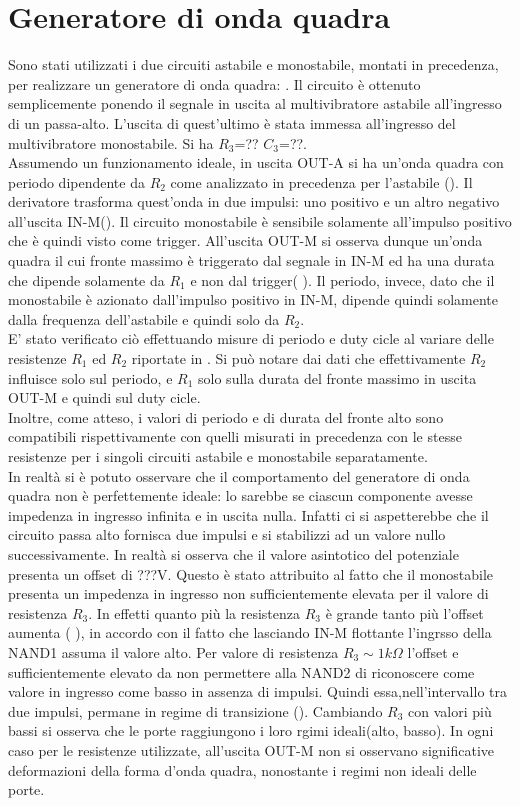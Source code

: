 \section{Generatore di onda quadra}
Sono stati utilizzati i due circuiti astabile e monostabile, montati in precedenza, per realizzare un generatore di onda quadra: \fig{}. Il circuito è ottenuto semplicemente ponendo il segnale in uscita al multivibratore astabile all'ingresso di un passa-alto. L'uscita di quest'ultimo è stata immessa all'ingresso del multivibratore monostabile. Si ha $R_{3}$=?? $C_{3}$=??. \\
Assumendo un funzionamento ideale, in uscita OUT-A si ha un'onda quadra con periodo dipendente da $R_{2}$ come analizzato in precedenza per l'astabile (\fig{}). Il derivatore trasforma quest'onda in due impulsi: uno positivo e un altro negativo all'uscita IN-M(\fig{}). Il circuito monostabile è sensibile solamente all'impulso positivo che è quindi visto come trigger.
 All'uscita OUT-M si osserva dunque un'onda quadra il cui fronte massimo è triggerato dal segnale in IN-M ed ha una durata che dipende solamente da $R_{1}$ e non dal trigger(\fig{} ). Il periodo, invece, dato che il monostabile è azionato dall'impulso positivo in IN-M, dipende quindi solamente dalla frequenza dell'astabile e quindi solo da $R_{2}$.\\
 E' stato verificato ciò effettuando misure di periodo e duty cicle al variare delle resistenze $R_{1}$ ed $R_{2}$ riportate in \tab{}. Si può notare dai dati che effettivamente $R_{2}$ influisce solo sul periodo, e $R_{1}$ solo sulla durata del fronte massimo in uscita OUT-M e quindi sul duty cicle. \\
 Inoltre, come atteso, i valori di periodo e di durata del fronte alto sono compatibili rispettivamente con quelli misurati in precedenza con le stesse resistenze per i singoli circuiti astabile e monostabile separatamente.\\
 In realtà si è potuto osservare che il comportamento del generatore di onda quadra non è perfettemente ideale: lo sarebbe se ciascun componente avesse impedenza in ingresso infinita e in uscita nulla. Infatti ci si aspetterebbe che il circuito passa alto fornisca due impulsi e si stabilizzi ad un valore nullo successivamente. In realtà si osserva che il valore asintotico del potenziale presenta un offset di ???V. Questo è stato attribuito al fatto che il monostabile presenta un impedenza in ingresso non sufficientemente elevata per il valore di resistenza $R_{3}$. In effetti quanto più la resistenza $R_{3}$ è grande tanto più l'offset aumenta (\tab{} ), in accordo con il fatto che lasciando IN-M flottante l'ingrsso della NAND1 assuma il valore alto. Per valore di resistenza $R_{3} \sim 1 k\Omega$ l'offset e sufficientemente elevato da non permettere alla NAND2 di riconoscere come valore in ingresso come basso in assenza di impulsi. Quindi essa,nell'intervallo tra due impulsi, permane in regime di transizione (\fig{}). Cambiando $R_{3}$ con valori più bassi si osserva che le porte raggiungono i loro rgimi ideali(alto, basso). In ogni caso per le resistenze utilizzate, all'uscita OUT-M non si osservano significative deformazioni della forma d'onda quadra, nonostante i regimi non ideali delle porte.\\
